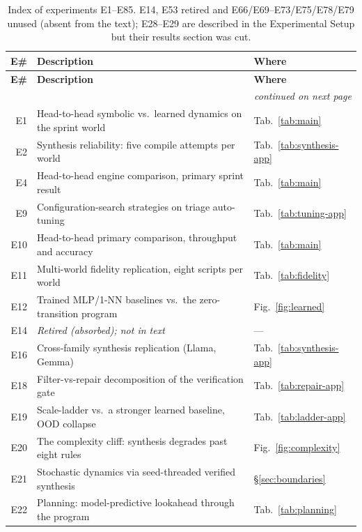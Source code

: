\documentclass[11pt]{article}
\begin{document}
\begingroup\footnotesize\setlength{\tabcolsep}{4pt}
\begin{longtable}{@{}r p{} l@{}}
\caption{Index of experiments E1--E85. E14, E53 retired and E66/E69--E73/E75/E78/E79
unused (absent from the text); E28--E29 are described in the Experimental Setup but
their results section was cut.}\label{tab:experiment-index}\\
\toprule
\textbf{E\#} & \textbf{Description} & \textbf{Where} \\
\midrule
\endfirsthead
\toprule
\textbf{E\#} & \textbf{Description} & \textbf{Where} \\
\midrule
\endhead
\midrule
\multicolumn{3}{r}{\footnotesize\itshape continued on next page}\\
\endfoot
\bottomrule
\endlastfoot
E1 & Head-to-head symbolic vs.\ learned dynamics on the sprint world & Tab.~\ref{tab:main} \\
E2 & Synthesis reliability: five compile attempts per world & Tab.~\ref{tab:synthesis-app} \\
E4 & Head-to-head engine comparison, primary sprint result & Tab.~\ref{tab:main} \\
E9 & Configuration-search strategies on triage auto-tuning & Tab.~\ref{tab:tuning-app} \\
E10 & Head-to-head primary comparison, throughput and accuracy & Tab.~\ref{tab:main} \\
E11 & Multi-world fidelity replication, eight scripts per world & Tab.~\ref{tab:fidelity} \\
E12 & Trained MLP/1-NN baselines vs.\ the zero-transition program & Fig.~\ref{fig:learned} \\
E14 & \emph{Retired (absorbed); not in text} & --- \\
E16 & Cross-family synthesis replication (Llama, Gemma) & Tab.~\ref{tab:synthesis-app} \\
E18 & Filter-vs-repair decomposition of the verification gate & Tab.~\ref{tab:repair-app} \\
E19 & Scale-ladder vs.\ a stronger learned baseline, OOD collapse & Tab.~\ref{tab:ladder-app} \\
E20 & The complexity cliff: synthesis degrades past eight rules & Fig.~\ref{fig:complexity} \\
E21 & Stochastic dynamics via seed-threaded verified synthesis & \S\ref{sec:boundaries} \\
E22 & Planning: model-predictive lookahead through the program & Tab.~\ref{tab:planning} \\

\end{longtable}
\end{document}

